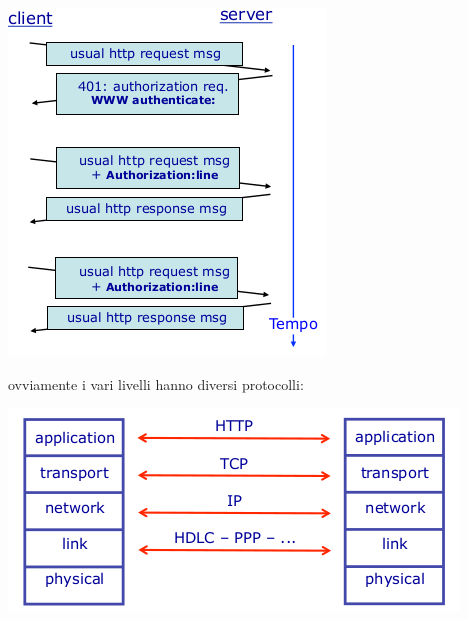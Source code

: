 \documentclass[a4paper,12pt, oneside]{book}
\begin{document}
\begin{center}
	\includegraphics[scale=0.7]{img/http6.png}
\end{center}
ovviamente i vari livelli hanno diversi protocolli:
\begin{center}
	\includegraphics[scale=0.7]{img/http7.png}
\end{center}
\end{document}
